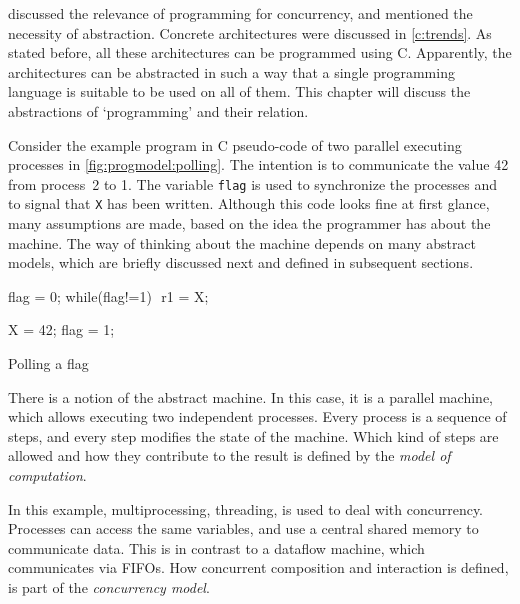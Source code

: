  discussed the relevance of programming for concurrency, and mentioned the necessity of abstraction.
Concrete architectures were discussed in \cref{c:trends}.
As stated before, all these architectures can be programmed using C.
Apparently, the architectures can be abstracted in such a way that a single programming language is suitable to be used on all of them.
This chapter will discuss the abstractions of `programming' and their relation.

Consider the example program in C pseudo-code of two parallel executing processes in \vref{fig:progmodel:polling}.
The intention is to communicate the value 42 from process~2 to 1.
The variable \lstinline|flag| is used to synchronize the processes and to signal that \lstinline|X| has been written.
Although this code looks fine at first glance, many assumptions are made, based on the idea the programmer has about the machine.
The way of thinking about the machine depends on many abstract models, which are briefly discussed next and defined in subsequent sections.

\begin{parcodes}%
\begin{parcode}{.4\linewidth}%
\begin{lstcode}[variable={flag,r1,X}]
flag = 0;$\label{l:progmodel:flag0}$
while(flag!=1) {}$\label{l:progmodel:flagpoll}$
r1 = X;
\end{lstcode}%
\end{parcode}%
\begin{parcode}{.4\linewidth}%
\begin{lstcode}[variable={flag,X}]
X = 42;$\label{l:progmodel:wrx}$
flag = 1;$\label{l:progmodel:wrf}$
\end{lstcode}%
\end{parcode}%
\caption{Polling a flag}%
\label{fig:progmodel:polling}%
\end{parcodes}

There is a notion of the abstract machine.
In this case, it is a parallel machine, which allows executing two independent processes.
Every process is a sequence of steps, and every step modifies the state of the machine.
Which kind of steps are allowed and how they contribute to the result is defined by the \emph{model of computation}.

In this example, multiprocessing, \ie threading, is used to deal with concurrency.
Processes can access the same variables, and use a central shared memory to communicate data.
This is in contrast to a dataflow machine, which communicates via \acp{FIFO}.
How concurrent composition and interaction is defined, is part of the \emph{concurrency model}.


